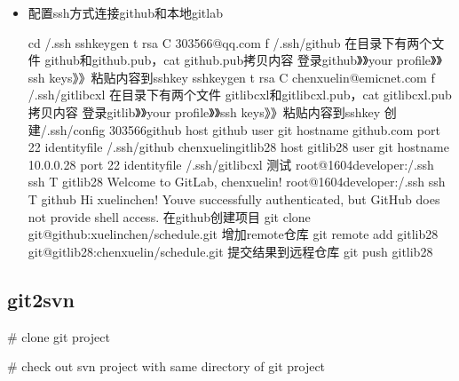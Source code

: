 \documentclass[a4paper,10pt,english]{sphinxmanual}
\begin{document}
\begin{itemize}
\item {} 
配置ssh方式连接github和本地gitlab

\begin{sphinxVerbatim}[commandchars=\\\{\}]
\PYGZsh{} cd \PYGZti{}/.ssh
\PYGZsh{} ssh\PYGZhy{}keygen \PYGZhy{}t rsa \PYGZhy{}C \PYGZdq{}303566@qq.com\PYGZdq{} \PYGZhy{}f \PYGZti{}/.ssh/github
\PYGZsh{} 在目录下有两个文件 github和github.pub，cat github.pub拷贝内容
\PYGZsh{} 登录github》》your profile》》ssh keys》》粘贴内容到sshkey
\PYGZsh{} ssh\PYGZhy{}keygen \PYGZhy{}t rsa \PYGZhy{}C \PYGZdq{}chenxuelin@emicnet.com\PYGZdq{} \PYGZhy{}f \PYGZti{}/.ssh/gitlib\PYGZhy{}cxl
\PYGZsh{} 在目录下有两个文件 gitlib\PYGZhy{}cxl和gitlib\PYGZhy{}cxl.pub，cat gitlib\PYGZhy{}cxl.pub拷贝内容
\PYGZsh{} 登录gitlib》》your profile》》ssh keys》》粘贴内容到sshkey
\PYGZsh{} 创建\PYGZti{}/.ssh/config
\PYGZsh{}303566\PYGZhy{}github
  host github
  user git
  hostname github.com
  port 22
  identityfile \PYGZti{}/.ssh/github
  \PYGZsh{}chenxuelin\PYGZhy{}gitlib28
  host gitlib28
  user git
  hostname 10.0.0.28
  port 22
  identityfile \PYGZti{}/.ssh/gitlib\PYGZhy{}cxl
\PYGZsh{} 测试
\PYGZsh{}\PYGZsh{} root@1604developer:\PYGZti{}/.ssh\PYGZsh{} ssh \PYGZhy{}T gitlib28
    Welcome to GitLab, chenxuelin!
\PYGZsh{}\PYGZsh{} root@1604developer:\PYGZti{}/.ssh\PYGZsh{} ssh \PYGZhy{}T github
    Hi xuelinchen! You\PYGZsq{}ve successfully authenticated, but GitHub does not provide shell access.
\PYGZsh{} 在github创建项目
   git clone git@github:xuelinchen/schedule.git
   \PYGZsh{} 增加remote仓库
   git remote add gitlib28 git@gitlib28:chenxuelin/schedule.git
   \PYGZsh{} 提交结果到远程仓库
   git push gitlib28
\end{sphinxVerbatim}

\end{itemize}


\subsection{git2svn}
\label{\detokenize{versionCtrl/git:git2svn}}
\# clone git project

\begin{sphinxVerbatim}[commandchars=\\\{\}]
  
\end{sphinxVerbatim}

\# check out svn project with same directory of git project
\end{document}
